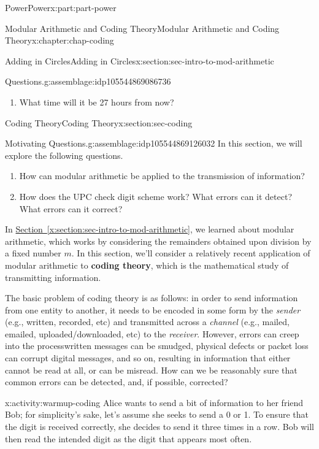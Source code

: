 \documentclass[oneside,10pt,]{book}
\newcommand{\xreffont}{\relax}
\newcommand{\terminology}[1]{\textbf{#1}}
\numberwithin{equation}{section}
\begin{document}
\begin{partptx}{Power}{}{Power}{}{}{x:part:part-power}
\begin{chapterptx}{Modular Arithmetic and Coding Theory}{}{Modular Arithmetic and Coding Theory}{}{}{x:chapter:chap-coding}
\begin{sectionptx}{Adding in Circles}{}{Adding in Circles}{}{}{x:section:sec-intro-to-mod-arithmetic}
\begin{assemblage}{Questions.}{g:assemblage:idp105544869086736}
\begin{enumerate}
\item{}What time will it be 27 hours from now?%
\end{enumerate}
%
\end{assemblage}
\end{sectionptx}
%
%
\typeout{************************************************}
\typeout{************************************************}
%
\begin{sectionptx}{Coding Theory}{}{Coding Theory}{}{}{x:section:sec-coding}
\begin{assemblage}{Motivating Questions.}{g:assemblage:idp105544869126032}%
In this section, we will explore the following questions. %
\begin{enumerate}
\item{}How can modular arithmetic be applied to the transmission of information?%
\item{}How does the UPC check digit scheme work? What errors can it detect? What errors can it correct?%
\end{enumerate}
%
\end{assemblage}
In \hyperref[x:section:sec-intro-to-mod-arithmetic]{Section~{\xreffont\ref{x:section:sec-intro-to-mod-arithmetic}}}, we learned about modular arithmetic, which works by considering the remainders obtained upon division by a fixed number \(m\). In this section, we'll consider a relatively recent application of modular arithmetic to \terminology{coding theory}, which is the mathematical study of transmitting information.%
\par
The basic problem of coding theory is as follows: in order to send information from one entity to another, it needs to be encoded in some form by the \emph{sender} (e.g., written, recorded, etc) and transmitted across a \emph{channel} (e.g., mailed, emailed, uploaded\slash{}downloaded, etc) to the \emph{receiver}. However, errors can creep into the process\textemdash{}written messages can be smudged, physical defects or packet loss can corrupt digital messages, and so on, resulting in information that either cannot be read at all, or can be misread. How can we be reasonably sure that common errors can be detected, and, if possible, corrected?%
\begin{activity}{}{x:activity:warmup-coding}%
Alice wants to send a bit of information to her friend Bob; for simplicity's sake, let's assume she seeks to send a 0 or 1. To ensure that the digit is received correctly, she decides to send it three times in a row. Bob will then read the intended digit as the digit that appears most often.%

\end{activity}
\end{sectionptx}
\end{chapterptx}
\end{partptx}
\end{document}
